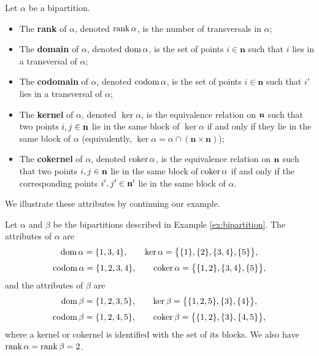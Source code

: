 \begin{definition}
  Let $\alpha$ be a bipartition.
  \begin{itemize}
  \item The \textbf{rank} of $\alpha$, denoted $\operatorname{rank} \alpha$, is the number of
    transversals in $\alpha$;
  \item The \textbf{domain} of $\alpha$, denoted $\operatorname{dom} \alpha$, is the set of
    points $i \in \mathbf{n}$ such that $i$ lies in a transversal of $\alpha$;
  \item The \textbf{codomain} of $\alpha$, denoted $\operatorname{codom} \alpha$, is the set
    of points $i \in \mathbf{n}$ such that $i'$ lies in a transversal of
    $\alpha$;
  \item The \textbf{kernel} of $\alpha$, denoted $\ker \alpha$, is the
    equivalence relation on $\mathbf{n}$ such that two points $i, j \in \mathbf{n}$ lie in the
    same block of $\ker \alpha$ if and only if they lie in the same block of
    $\alpha$ (equivalently,
    $\ker \alpha = \alpha \cap (\mathbf{n} \times \mathbf{n})$);
  \item The \textbf{cokernel} of $\alpha$, denoted $\operatorname{coker} \alpha$, is the
    equivalence relation on $\mathbf{n}$ such that two points $i, j \in \mathbf{n}$ lie in the
    same block of $\operatorname{coker} \alpha$ if and only if the corresponding points
    $i', j' \in \mathbf{n}'$ lie in the same block of $\alpha$.
  \end{itemize}
\end{definition}

We illustrate these attributes by continuing our example.

\begin{example}
  \label{ex:codomain}
  Let $\alpha$ and $\beta$ be the bipartitions described in Example
  \ref{ex:bipartition}.  The attributes of $\alpha$ are
  $$\operatorname{dom} \alpha = \{1,3,4\}, \qquad
  \ker \alpha = \big\{\{1\}, \{2\}, \{3,4\}, \{5\}\big\},$$
  $$\operatorname{codom} \alpha = \{1,2,3,4\}, \qquad
  \operatorname{coker} \alpha = \big\{\{1, 2\}, \{3,4\}, \{5\}\big\},$$
  and the attributes of $\beta$ are
  $$\operatorname{dom} \beta = \{1,2,3,5\}, \qquad
  \ker \beta = \big\{\{1,2,5\}, \{3\}, \{4\}\big\},$$
  $$\operatorname{codom} \beta = \{1,2,4,5\}, \qquad
  \operatorname{coker} \beta = \big\{\{1,2\}, \{3\}, \{4,5\}\big\},$$
  where a kernel or cokernel is identified with the set of its blocks.
  We also have $\operatorname{rank} \alpha = \operatorname{rank} \beta = 2$.
\end{example}


